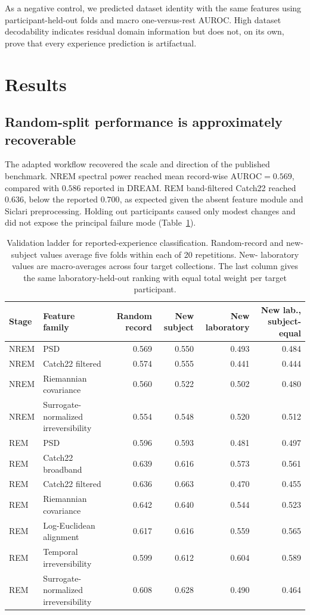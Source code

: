 \documentclass[10pt,twocolumn]{article}
\newcommand{\AUC}{\mathrm{AUROC}}
\begin{document}
As a negative control, we predicted dataset identity with the same features
using participant-held-out folds and macro one-versus-rest AUROC. High dataset
decodability indicates residual domain information but does not, on its own,
prove that every experience prediction is artifactual.

\section{Results}

\subsection{Random-split performance is approximately recoverable}

The adapted workflow recovered the scale and direction of the published
benchmark. NREM spectral power reached mean record-wise $\AUC=0.569$, compared
with $0.586$ reported in DREAM. REM band-filtered Catch22 reached $0.636$,
below the reported $0.700$, as expected given the absent feature module and
Siclari preprocessing. Holding out participants caused only modest changes and
did not expose the principal failure mode (Table~\ref{tab:ladder}).

\begin{table}[t]
\centering
\caption{Validation ladder for reported-experience classification. Random-record
and new-subject values average five folds within each of 20 repetitions. New-
laboratory values are macro-averages across four target collections. The last
column gives the same laboratory-held-out ranking with equal total weight per
target participant.}
\label{tab:ladder}
\small
\begin{tabular}{llrrrr}
\toprule
Stage & Feature family & Random record & New subject & New laboratory & New lab., subject-equal \\
\midrule
NREM & PSD & 0.569 & 0.550 & 0.493 & 0.484 \\
NREM & Catch22 filtered & 0.574 & 0.555 & 0.441 & 0.444 \\
NREM & Riemannian covariance & 0.560 & 0.522 & 0.502 & 0.480 \\
NREM & Surrogate-normalized irreversibility & 0.554 & 0.548 & 0.520 & 0.512 \\
\midrule
REM & PSD & 0.596 & 0.593 & 0.481 & 0.497 \\
REM & Catch22 broadband & 0.639 & 0.616 & 0.573 & 0.561 \\
REM & Catch22 filtered & 0.636 & 0.663 & 0.470 & 0.455 \\
REM & Riemannian covariance & 0.642 & 0.640 & 0.544 & 0.523 \\
REM & Log-Euclidean alignment & 0.617 & 0.616 & 0.559 & 0.565 \\
REM & Temporal irreversibility & 0.599 & 0.612 & 0.604 & 0.589 \\
REM & Surrogate-normalized irreversibility & 0.608 & 0.628 & 0.490 & 0.464 \\
\bottomrule
\end{tabular}
\end{table}
\end{document}
